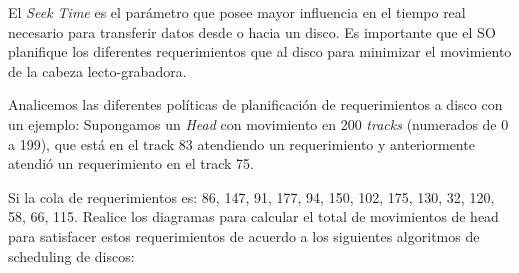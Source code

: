 \begin{questions}

\question El \textit{Seek Time} es el parámetro que posee mayor influencia en el tiempo real necesario para transferir datos desde o hacia un disco. Es importante que el SO planifique los diferentes requerimientos que al disco para minimizar el movimiento de la cabeza lecto-grabadora.

\hspace{20pt} Analicemos las diferentes políticas de planificación de requerimientos a disco con un ejemplo: Supongamos un \textit{Head} con movimiento en 200 \textit{tracks} (numerados de 0 a 199), que está en el track 83 atendiendo un requerimiento y anteriormente atendió un requerimiento en el track 75.

\hspace{20pt} Si la cola de requerimientos es: 86, 147, 91, 177, 94, 150, 102, 175, 130, 32, 120, 58, 66, 115. Realice los diagramas para calcular el total de movimientos de head para satisfacer estos requerimientos de acuerdo a los siguientes algoritmos de scheduling de discos:
\end{questions}
